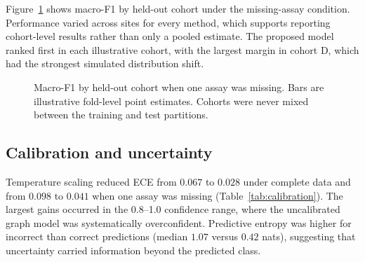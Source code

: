 Figure~\ref{fig:cohorts} shows macro-F1 by held-out cohort under the missing-assay
condition. Performance varied across sites for every method, which supports
reporting cohort-level results rather than only a pooled estimate. The proposed
model ranked first in each illustrative cohort, with the largest margin in cohort
D, which had the strongest simulated distribution shift.

\begin{figure}[tbp]
\centering
{}
\caption{Macro-F1 by held-out cohort when one assay was missing. Bars are
illustrative fold-level point estimates. Cohorts were never mixed between the
training and test partitions.}
\label{fig:cohorts}
\end{figure}

\subsection{Calibration and uncertainty}

Temperature scaling reduced ECE from $0.067$ to $0.028$ under complete data and
from $0.098$ to $0.041$ when one assay was missing (Table~\ref{tab:calibration}).
The largest gains occurred in the 0.8--1.0 confidence range, where the
uncalibrated graph model was systematically overconfident. Predictive entropy was
higher for incorrect than correct predictions (median $1.07$ versus $0.42$ nats),
suggesting that uncertainty carried information beyond the predicted class.

